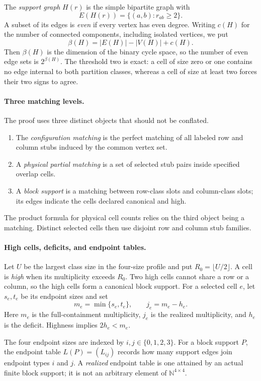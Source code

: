 The \emph{support graph} $H(r)$ is the simple bipartite graph with
\[
  E(H(r))=\{(a,b):r_{ab}\ge2\}.
\]
A subset of its edges is \emph{even} if every vertex has even degree. Writing
$c(H)$ for the number of connected components, including isolated vertices,
we put
\[
  \beta(H)=|E(H)|-|V(H)|+c(H).
\]
Then $\beta(H)$ is the dimension of the binary cycle space, so the number of
even edge sets is $2^{\beta(H)}$. The threshold two is exact: a cell of size
zero or one contains no edge internal to both partition classes, whereas a
cell of size at least two forces their two signs to agree.

\paragraph{Three matching levels.}
The proof uses three distinct objects that should not be conflated.
\begin{enumerate}
\item The \emph{configuration matching} is the perfect matching of all labeled
row and column stubs induced by the common vertex set.
\item A \emph{physical partial matching} is a set of selected stub pairs inside
specified overlap cells.
\item A \emph{block support} is a matching between row-class slots and
column-class slots; its edges indicate the cells declared canonical and high.
\end{enumerate}
The product formula for physical cell counts relies on the third object being
a matching. Distinct selected cells then use disjoint row and column stub
families.

\paragraph{High cells, deficits, and endpoint tables.}
Let $U$ be the largest class size in the four-size profile and put
$R_0=\lfloor U/2\rfloor$. A cell is \emph{high} when its multiplicity exceeds
$R_0$. Two high cells cannot share a row or a column, so the high cells form a
canonical block support. For a selected cell $e$, let $s_e,t_e$ be its endpoint
sizes and set
\[
  m_e=\min\{s_e,t_e\},
  \qquad
  j_e=m_e-h_e.
\]
Here $m_e$ is the full-containment multiplicity, $j_e$ is the realized
multiplicity, and $h_e$ is the deficit. Highness implies $2h_e<m_e$.

The four endpoint sizes are indexed by $i,j\in\{0,1,2,3\}$. For a block support
$P$, the endpoint table $L(P)=(L_{ij})$ records how many support edges join
endpoint types $i$ and $j$. A \emph{realized} endpoint table is one attained by
an actual finite block support; it is not an arbitrary element of
$\mathbb N^{4\times4}$.

